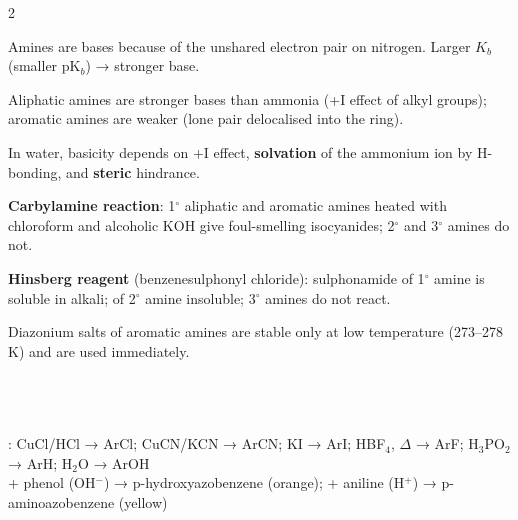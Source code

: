 \documentclass[10pt,a4paper]{extarticle}
\begin{document}
\begin{multicols}{2}
\begin{fl}
\item Amines are bases because of the unshared electron pair on nitrogen. Larger $K_b$ (smaller pK$_b$) → stronger base.
\item Aliphatic amines are stronger bases than ammonia (+I effect of alkyl groups); aromatic amines are weaker (lone pair delocalised into the ring).
\item In water, basicity depends on +I effect, \textbf{solvation} of the ammonium ion by H-bonding, and \textbf{steric} hindrance.
\item \textbf{Carbylamine reaction}: 1$^\circ$ aliphatic and aromatic amines heated with chloroform and alcoholic KOH give foul-smelling isocyanides; 2$^\circ$ and 3$^\circ$ amines do not.
\item \textbf{Hinsberg reagent} (benzenesulphonyl chloride): sulphonamide of 1$^\circ$ amine is soluble in alkali; of 2$^\circ$ amine insoluble; 3$^\circ$ amines do not react.
\item Diazonium salts of aromatic amines are stable only at low temperature (273--278 K) and are used immediately.
\end{fl}

\begin{kbox}
\\[1pt]
\\[1pt]
\\[1pt]
: CuCl/HCl → ArCl; CuCN/KCN → ArCN; KI → ArI; HBF$_4$, $\Delta$ → ArF; H$_3$PO$_2$ → ArH; H$_2$O → ArOH\\[1pt]
+ phenol (OH$^-$) → p-hydroxyazobenzene (orange); + aniline (H$^+$) → p-aminoazobenzene (yellow)
\end{kbox}


\end{multicols}
\end{document}
